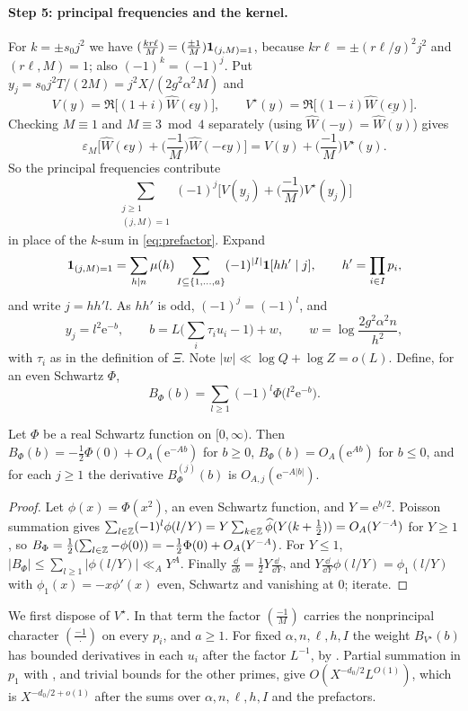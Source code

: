 \documentclass[11pt,colorlinks]{charlie}
\newcommand{\e}{\mathrm{e}}
\begin{document}
\paragraph{Step 5: principal frequencies and the kernel.}
For $k=\pm s_0j^2$ we have $(\tfrac{kr\ell}M)=(\tfrac{\pm1}M)\mathbf{1}_{(j,M)=1}$, because $kr\ell=\pm(r\ell/g)^2j^2$ and $(r\ell,M)=1$; also $(-1)^k=(-1)^j$. Put $y_j=s_0j^2T/(2M)=j^2X/(2g^2\alpha^2M)$ and
\[
 V(y)=\Re\big[(1+i)\widehat W(\epsilon y)\big],\qquad V^\star(y)=\Re\big[(1-i)\widehat W(\epsilon y)\big].
\]
Checking $M\equiv1$ and $M\equiv3\bmod4$ separately (using $\widehat W(-y)=\overline{\widehat W(y)}$) gives
\[
 \varepsilon_M\Big[\widehat W(\epsilon y)+\Big(\frac{-1}M\Big)\widehat W(-\epsilon y)\Big]=V(y)+\Big(\frac{-1}M\Big)V^\star(y).
\]
So the principal frequencies contribute
\[
 \sum_{\substack{j\ge1\\(j,M)=1}}(-1)^j\Big[V(y_j)+\Big(\frac{-1}M\Big)V^\star(y_j)\Big]
\]
in place of the $k$-sum in \eqref{eq:prefactor}. Expand
\[
 \mathbf{1}_{(j,M)=1}=\sum_{h\mid n}\mu(h)\sum_{I\subseteq\{1,\dots,a\}}(-1)^{|I|}\mathbf{1}[hh'\mid j],\qquad h'=\prod_{i\in I}p_i,
\]
and write $j=hh'l$. As $hh'$ is odd, $(-1)^j=(-1)^l$, and
\[
 y_j=l^2\e^{-b},\qquad b=L\Big(\sum_i\tau_iu_i-1\Big)+w,\qquad w=\log\frac{2g^2\alpha^2n}{h^2},
\]
with $\tau_i$ as in the definition of $\Xi$. Note $|w|\ll\log Q+\log Z=o(L)$. Define, for an even Schwartz $\Phi$,
\[
 B_\Phi(b)=\sum_{l\ge1}(-1)^l\Phi\big(l^2\e^{-b}\big).
\]

\begin{lemma}\label{lem:kernel}
Let $\Phi$ be a real Schwartz function on $[0,\infty)$. Then $B_\Phi(b)=-\tfrac12\Phi(0)+O_A(\e^{-Ab})$ for $b\ge0$, $B_\Phi(b)=O_A(\e^{Ab})$ for $b\le0$, and for each $j\ge1$ the derivative $B_\Phi^{(j)}(b)$ is $O_{A,j}(\e^{-A|b|})$.
\end{lemma}
\begin{proof}
Let $\phi(x)=\Phi(x^2)$, an even Schwartz function, and $Y=\e^{b/2}$. Poisson summation gives $\sum_{l\in\mathbb{Z}}(-1)^l\phi(l/Y)=Y\sum_{k\in\mathbb{Z}}\widehat\phi(Y(k+\tfrac12))=O_A(Y^{-A})$ for $Y\ge1$, so $B_\Phi=\tfrac12(\sum_{l\in\mathbb{Z}}-\phi(0))=-\tfrac12\Phi(0)+O_A(Y^{-A})$. For $Y\le1$, $|B_\Phi|\le\sum_{l\ge1}|\phi(l/Y)|\ll_AY^A$. Finally $\frac{\dd}{\dd b}=\frac12Y\frac{\dd}{\dd Y}$, and $Y\frac{\dd}{\dd Y}\phi(l/Y)=\phi_1(l/Y)$ with $\phi_1(x)=-x\phi'(x)$ even, Schwartz and vanishing at $0$; iterate.
\end{proof}

We first dispose of $V^\star$. In that term the factor $(\tfrac{-1}M)$ carries the nonprincipal character $(\tfrac{-1}{\cdot})$ on every $p_i$, and $a\ge1$. For fixed $\alpha,n,\ell,h,I$ the weight $B_{V^\star}(b)$ has bounded derivatives in each $u_i$ after the factor $L^{-1}$, by . Partial summation in $p_1$ with , and trivial bounds for the other primes, give $O(X^{-d_0/2}L^{O(1)})$, which is $X^{-d_0/2+o(1)}$ after the sums over $\alpha,n,\ell,h,I$ and the prefactors.
\end{document}
